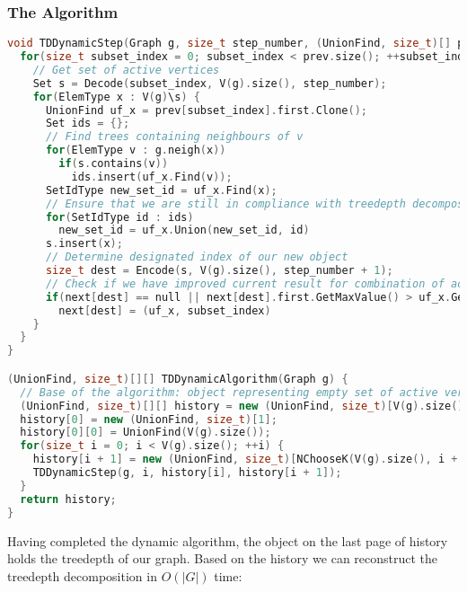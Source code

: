 \subsubsection{The Algorithm}
\begin{lstlisting}[language=C++]
void TDDynamicStep(Graph g, size_t step_number, (UnionFind, size_t)[] prev, (UnionFind, size_t)[] next) {
  for(size_t subset_index = 0; subset_index < prev.size(); ++subset_index) {
    // Get set of active vertices
    Set s = Decode(subset_index, V(g).size(), step_number);
    for(ElemType x : V(g)\s) {
      UnionFind uf_x = prev[subset_index].first.Clone();
      Set ids = {};
      // Find trees containing neighbours of v
      for(ElemType v : g.neigh(x))
        if(s.contains(v))
          ids.insert(uf_x.Find(v));
      SetIdType new_set_id = uf_x.Find(x);
      // Ensure that we are still in compliance with treedepth decomposition definition when adding x to active vertices
      for(SetIdType id : ids)
        new_set_id = uf_x.Union(new_set_id, id)
      s.insert(x);
      // Determine designated index of our new object
      size_t dest = Encode(s, V(g).size(), step_number + 1);
      // Check if we have improved current result for combination of active vertices represented by s
      if(next[dest] == null || next[dest].first.GetMaxValue() > uf_x.GetMaxValue())
        next[dest] = (uf_x, subset_index)
    }
  }
}

(UnionFind, size_t)[][] TDDynamicAlgorithm(Graph g) {
  // Base of the algorithm: object representing empty set of active vertices
  (UnionFind, size_t)[][] history = new (UnionFind, size_t)[V(g).size()][];
  history[0] = new (UnionFind, size_t)[1];
  history[0][0] = UnionFind(V(g).size());
  for(size_t i = 0; i < V(g).size(); ++i) {
    history[i + 1] = new (UnionFind, size_t)[NChooseK(V(g).size(), i + 1)];
    TDDynamicStep(g, i, history[i], history[i + 1]);
  }
  return history;
}
\end{lstlisting}
Having completed the dynamic algorithm, the object on the last page of history holds the treedepth of our graph. Based on the history we can reconstruct the treedepth decomposition in $O(|G|)$ time:
